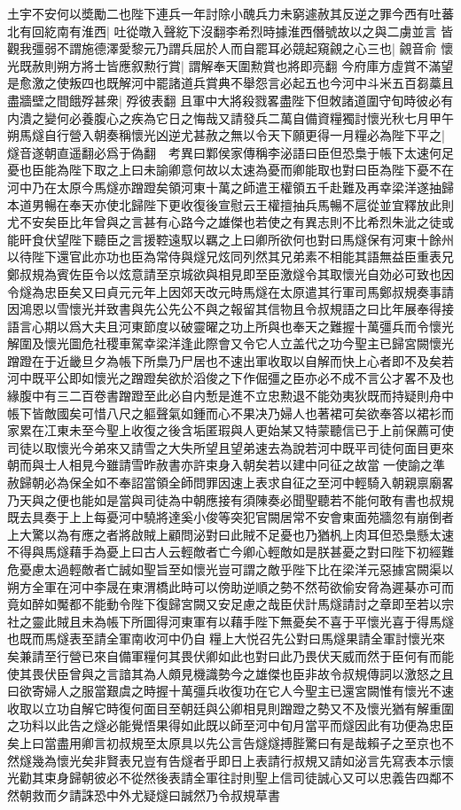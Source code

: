 土宇不安何以奬勵二也陛下連兵一年討除小醜兵力未窮遽赦其反逆之罪今西有吐蕃北有回紇南有淮西|{
	吐從暾入聲紇下沒翻李希烈時據淮西僭號故以之與二虜並言}
皆觀我彊弱不謂施德澤愛黎元乃謂兵屈於人而自罷耳必競起窺覦之心三也|{
	覦音俞}
懷光既赦則朔方將士皆應叙勲行賞|{
	謂解奉天圍勲賞也將即亮翻}
今府庫方虛賞不滿望是愈激之使叛四也既解河中罷諸道兵賞典不舉怨言必起五也今河中斗米五百芻藁且盡牆壁之間餓殍甚衆|{
	殍彼表翻}
且軍中大將殺戮畧盡陛下但敇諸道圍守旬時彼必有内潰之變何必養腹心之疾為它日之悔哉又請發兵二萬自備資糧獨討懷光秋七月甲午朔馬燧自行營入朝奏稱懷光凶逆尤甚赦之無以令天下願更得一月糧必為陛下平之|{
	燧音遂朝直遥翻必爲于偽翻　考異曰鄴侯家傳稱李泌語曰臣但恐梟于帳下太速何足憂也臣能為陛下取之上曰未諭卿意何故以太速為憂而卿能取也對曰臣為陛下憂不在河中乃在太原今馬燧亦蹭蹬矣領河東十萬之師遣王權領五千赴難及再幸梁洋遂抽歸本道男暢在奉天亦使北歸陛下更收復後宣慰云王權擅抽兵馬暢不扈從並宜釋放此則尤不安矣臣比年曾與之言甚有心路今之雄傑也若使之有異志則不比希烈朱泚之徒或能旰食伏望陛下聽臣之言援鞚遠馭以羈之上曰卿所欲何也對曰馬燧保有河東十餘州以待陛下還官此亦功也臣為常侍與燧兄炫同列然其兄弟素不相能其語無益臣重表兄鄭叔規為賓佐臣令以炫意請至京城欲與相見即至臣激燧令其取懷光自効必可致也因令燧為忠臣矣又曰貞元元年上因郊天改元時馬燧在太原遣其行軍司馬鄭叔規奏事請因鴻恩以雪懷光并致書與先公先公不與之報留其信物且令叔規語之曰比年展奉得接語言心期以爲大夫且河東節度以破靈曜之功上所與也奉天之難握十萬彊兵而令懷光解圍及懷光圖危社稷車駕幸梁洋逢此際會又令它人立盖代之功今聖主已歸宮闕懷光蹭蹬在于近畿旦夕為帳下所梟乃尸居也不速出軍收取以自解而快上心者即不及矣若河中既平公即如懷光之蹭蹬矣欲於滔俊之下作倔彊之臣亦必不成不言公才畧不及也緣腹中有三二百卷書蹭蹬至此必自内慙是進不立忠勲退不能効夷狄既而持疑則舟中帳下皆敵國矣可惜八尺之軀聲氣如鍾而心不果决乃婦人也著裙可矣欲奉答以裙衫而家累在冮東未至今聖上收復之後含垢匿瑕與人更始某又特蒙聽信已于上前保薦可使司徒以取懷光今弟來又請雪之大失所望且望弟速去為說若河中既平司徒何面目更來朝而與士人相見今雖請雪昨赦書亦許束身入朝矣若以建中冋征之故當一使諭之準赦歸朝必為保全如不奉詔當領全師問罪因速上表求自征之至河中輕騎入朝親禀廟畧乃天與之便也能如是當與司徒為中朝應接有須陳奏必聞聖聽若不能何敢有書也叔規既去具奏于上上每憂河中驍將達奚小俊等突犯官闕居常不安會東面苑牆忽有崩倒者上大驚以為有應之者將啟賊上顧問泌對曰此賊不足憂也乃猶杋上肉耳但恐梟懸太速不得與馬燧藉手為憂上曰古人云輕敵者亡今卿心輕敵如是朕甚憂之對曰陛下初經難危憂慮太過輕敵者亡誠如聖旨至如懷光豈可謂之敵乎陛下比在梁洋元惡據宮闕渠以朔方全軍在河中李晟在東渭橋此時可以傍助逆順之勢不然苟欲偷安脅為遲棊亦可而竟如醉如魘都不能動令陛下復歸宮闕又安足慮之哉臣伏計馬燧請討之章即至若以宗社之靈此賊且未為帳下所圖得河東軍有以藉手陛下無憂矣不喜于平懷光喜于得馬燧也既而馬燧表至請全軍南收河中仍自糧上大悦召先公對曰馬燧果請全軍討懷光來矣兼請至行營已來自備軍糧何其畏伏卿如此也對曰此乃畏伏天威而然于臣何有而能使其畏伏臣曾與之言諳其為人頗見機識勢今之雄傑也臣非故令叔規傳詞以激怒之且曰欲寄婦人之服當艱虞之時握十萬彊兵收復功在它人今聖主已還宮闕惟有懷光不速收取以立功自解它時復何面目至朝廷與公卿相見則蹭蹬之勢又不及懷光猶有解重圍之功料以此告之燧必能覺悟果得如此既以師至河中旬月當平而燧因此有功便為忠臣矣上曰當盡用卿言初叔規至太原具以先公言告燧燧搏䏶驚曰有是哉賴子之至京也不然燧幾為懷光矣非賢表兄豈有告燧者乎即日上表請行叔規又請如泌言先寫表本示懷光勸其束身歸朝彼必不從然後表請全軍往討則聖上信司徒誠心又可以忠義告四鄰不然朝救而夕請誅恐中外尤疑燧曰誠然乃令叔規草書}
